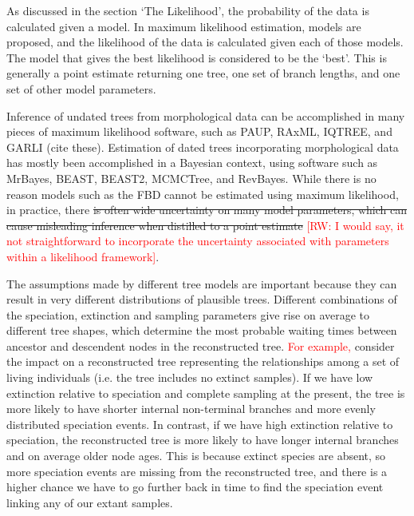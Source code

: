 \documentclass[11pt]{article}
\makeatletter
\newcommand{\rw}[1]{{\textcolor{red}{[RW: #1]}}} %
\newcommand{\edit}[1]{{\textcolor{red}{#1}}} %
\newenvironment{boxedtext}[1]{%
  \begin{mdframed}[frametitle=#1,
    frametitlefont=\scshape\mdseries\sffamily,
    frametitlealignment=\centering,
    backgroundcolor=black!20,
    hidealllines=true,
    innerleftmargin=11\p@,innerrightmargin=11\p@,
    frametitleaboveskip=0.5\baselineskip,
    innerbottommargin=0.5\baselineskip,
    skipabove=\baselineskip,skipbelow=0.5\baselineskip]
}{%
  \end{mdframed}%
}
\makeatother
\begin{document}
\begin{boxedtext}{Maximum Likelihood and Bayesian Esitmation}

As discussed in the section `The Likelihood', the probability of the data is calculated given a model. 
In maximum likelihood estimation, models are proposed, and the likelihood of the data is calculated given each of those models.
The model that gives the best likelihood is considered to be the `best'.
This is generally a point estimate returning one tree, one set of branch lengths, and one set of other model parameters.

Inference of undated trees from morphological data can be accomplished in many pieces of maximum likelihood software, such as PAUP, RAxML, IQTREE, and GARLI (cite these).
Estimation of dated trees incorporating morphological data has mostly been accomplished in a Bayesian context, using software such as MrBayes, BEAST, BEAST2, MCMCTree, and RevBayes.
While there is no reason models such as the FBD cannot be estimated using maximum likelihood, in practice, there \sout{is often wide uncertainty on many model parameters, which can cause misleading inference when distilled to a point estimate} \rw{I would say, it not straightforward to incorporate the uncertainty associated with parameters within a likelihood framework}.
\end{boxedtext}


The assumptions made by different tree models are important because they can result in very different distributions of plausible trees.
Different combinations of the speciation, extinction and sampling parameters give rise on average to different tree shapes, which determine the most probable waiting times between ancestor and descendent nodes 
in the reconstructed tree.
 \edit{For example,} consider the impact on a reconstructed tree representing the relationships among a set of living individuals (i.e. the tree includes no extinct samples). 
If we have low extinction relative to speciation and complete sampling at the present, the tree is more likely to have shorter internal non-terminal branches and more evenly distributed speciation events.
In contrast, if we have high extinction relative to speciation, the reconstructed tree is more likely to have longer internal branches and on average older node ages. 
This is because extinct species are absent, so more speciation events are missing from the reconstructed tree, and there is a higher chance we have to go further back in time to find the speciation event linking any of our extant samples.
\end{document}
